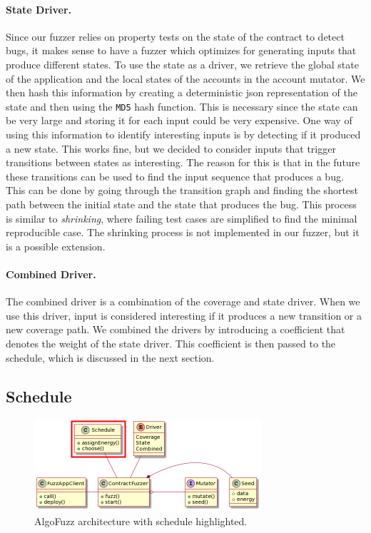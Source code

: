 \paragraph{State Driver.}
Since our fuzzer relies on property tests on the state of the contract to detect bugs, it makes sense to have a fuzzer which optimizes for generating inputs that produce different states.
To use the state as a driver, we retrieve the global state of the application and the local states of the accounts in the account mutator.
We then hash this information by creating a deterministic json representation of the state and then using the \texttt{MD5} hash function.
This is necessary since the state can be very large and storing it for each input could be very expensive.
One way of using this information to identify interesting inputs is by detecting if it produced a new state.
This works fine, but we decided to consider inputs that trigger transitions between states as interesting.
The reason for this is that in the future these transitions can be used to find the input sequence that produces a bug.
This can be done by going through the transition graph and finding the shortest path between the initial state and the state that produces the bug.
This process is similar to \emph{shrinking}, where failing test cases are simplified to find the minimal reproducible case.
The shrinking process is not implemented in our fuzzer, but it is a possible extension.

\paragraph{Combined Driver.}
The combined driver is a combination of the coverage and state driver.
When we use this driver, input is considered interesting if it produces a new transition or a new coverage path.
We combined the drivers by introducing a coefficient that denotes the weight of the state driver.
This coefficient is then passed to the schedule, which is discussed in the next section.

\subsection*{Schedule}

\begin{figure}[!htbp]
    \centering
    \includegraphics[width=0.75\textwidth]{figures/arc-schedule.png}
    \caption{AlgoFuzz architecture with schedule highlighted.}\label{fig:architecture-schedule}
\end{figure}

